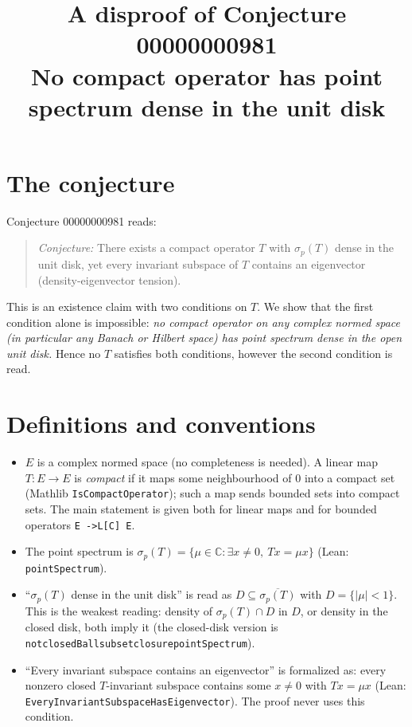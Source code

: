 \documentclass[11pt]{article}
\title{A disproof of Conjecture 00000000981\\[2pt]
\large No compact operator has point spectrum dense in the unit disk}
\date{}
\theoremstyle{definition}
\theoremstyle{remark}
\renewcommand{\_}{\oldus\allowbreak}
\begin{document}
\sloppy
\maketitle

\section{The conjecture}

Conjecture 00000000981 reads:

\begin{quote}
\emph{Conjecture:} There exists a compact operator $T$ with $\sigma_p(T)$ dense in the unit disk, yet every
invariant subspace of $T$ contains an eigenvector (density-eigenvector tension).
\end{quote}

This is an existence claim with two conditions on $T$. We show that the first condition alone is impossible:
\emph{no compact operator on any complex normed space (in particular any Banach or Hilbert space) has point
spectrum dense in the open unit disk.} Hence no $T$ satisfies both conditions, however the second condition
is read.

\section{Definitions and conventions}

\begin{itemize}
  \item $E$ is a complex normed space (no completeness is needed). A linear map $T:E\to E$ is
        \emph{compact} if it maps some neighbourhood of $0$ into a compact set (Mathlib
        \texttt{IsCompactOperator}); such a map sends bounded sets into compact sets. The main statement is
        given both for linear maps and for bounded operators \texttt{E ->L[C] E}.
  \item The point spectrum is $\sigma_p(T)=\{\mu\in\mathbb C:\exists x\ne0,\ Tx=\mu x\}$
        (Lean: \texttt{pointSpectrum}).
  \item ``$\sigma_p(T)$ dense in the unit disk'' is read as $D\subseteq\overline{\sigma_p(T)}$ with
        $D=\{|\mu|<1\}$. This is the weakest reading: density of $\sigma_p(T)\cap D$ in $D$, or density in the
        closed disk, both imply it (the closed-disk version is \texttt{not\_closedBall\_subset\_closure\_pointSpectrum}).
  \item ``Every invariant subspace contains an eigenvector'' is formalized as: every nonzero closed
        $T$-invariant subspace contains some $x\neq0$ with $Tx=\mu x$
        (Lean: \texttt{EveryInvariantSubspaceHasEigenvector}). The proof never uses this condition.
\end{itemize}
\end{document}
